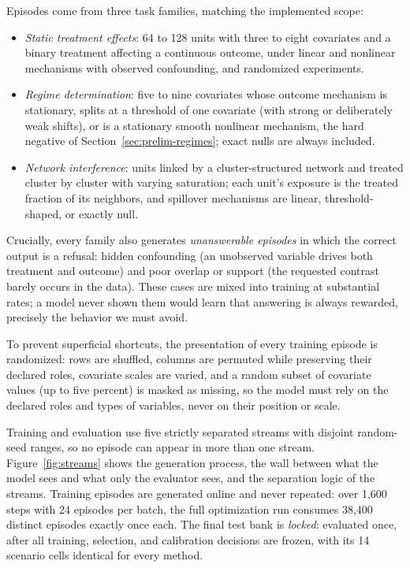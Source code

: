\documentclass[electronics,article,submit,oneauthor]{Definitions/mdpi}
\begin{document}
Episodes come from three task families, matching the implemented scope:
\begin{itemize}
\item \emph{Static treatment effects}: 64 to 128 units with three to eight covariates and a binary treatment affecting a continuous outcome, under linear and nonlinear mechanisms with observed confounding, and randomized experiments.
\item \emph{Regime determination}: five to nine covariates whose outcome mechanism is stationary, splits at a threshold of one covariate (with strong or deliberately weak shifts), or is a stationary smooth nonlinear mechanism, the hard negative of Section~\ref{sec:prelim-regimes}; exact nulls are always included.
\item \emph{Network interference}: units linked by a cluster-structured network and treated cluster by cluster with varying saturation; each unit's exposure is the treated fraction of its neighbors, and spillover mechanisms are linear, threshold-shaped, or exactly null.
\end{itemize}
Crucially, every family also generates \emph{unanswerable episodes} in which the correct output is a refusal: hidden confounding (an unobserved variable drives both treatment and outcome) and poor overlap or support (the requested contrast barely occurs in the data). These cases are mixed into training at substantial rates; a model never shown them would learn that answering is always rewarded, precisely the behavior we must avoid.

To prevent superficial shortcuts, the presentation of every training episode is randomized: rows are shuffled, columns are permuted while preserving their declared roles, covariate scales are varied, and a random subset of covariate values (up to five percent) is masked as missing, so the model must rely on the declared roles and types of variables, never on their position or scale.

Training and evaluation use five strictly separated streams with disjoint random-seed ranges, so no episode can appear in more than one stream. Figure~\ref{fig:streams} shows the generation process, the wall between what the model sees and what only the evaluator sees, and the separation logic of the streams. Training episodes are generated online and never repeated: over 1,600 steps with 24 episodes per batch, the full optimization run consumes 38,400 distinct episodes exactly once each. The final test bank is \emph{locked}: evaluated once, after all training, selection, and calibration decisions are frozen, with its 14 scenario cells identical for every method.
\end{document}
